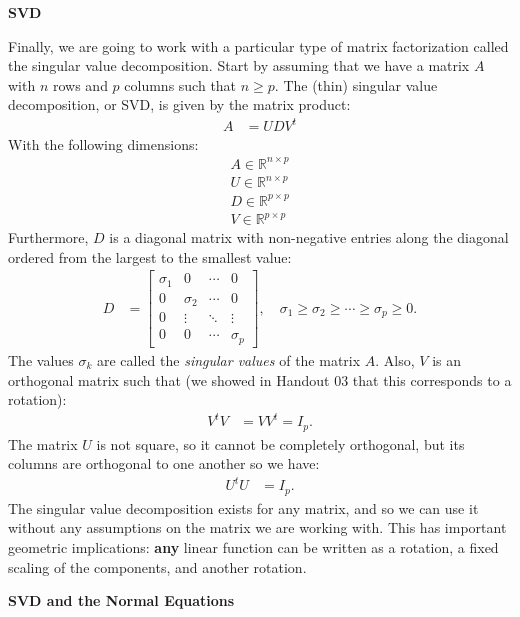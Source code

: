 \documentclass[12pt,hidelinks]{article}
\numberwithin{equation}{section}
\begin{document}
\textbf{SVD}

Finally, we are going to work with a particular type of matrix factorization
called the singular value decomposition. Start by assuming that we have a
matrix $A$ with $n$ rows and $p$ columns such that $n \geq p$. The (thin)
singular value decomposition, or SVD, is given by the matrix product:
\begin{align}
A &= U D V^t
\end{align}
With the following dimensions:
\begin{align}
A \in \mathbb{R}^{n \times p} \\
U \in \mathbb{R}^{n \times p} \\
D \in \mathbb{R}^{p \times p} \\
V \in \mathbb{R}^{p \times p}
\end{align}
Furthermore, $D$ is a diagonal matrix with non-negative entries along the
diagonal ordered from the largest to the smallest value:
\begin{align}
D &= \begin{bmatrix}
\sigma_1 & 0 & \cdots & 0\\
0 & \sigma_2 & \cdots & 0 \\
0 & \vdots & \ddots & \vdots \\
0 & 0 & \cdots & \sigma_p \end{bmatrix}, \quad \sigma_1 \geq \sigma_2 \geq \cdots \geq \sigma_p \geq 0.
\end{align}
The values $\sigma_k$ are called the \textit{singular values} of the matrix $A$.
Also, $V$ is an orthogonal matrix such that (we showed in Handout 03 that this
corresponds to a rotation):
\begin{align}
V^t V &= V V^t = I_p.
\end{align}
The matrix $U$ is not square, so it cannot be completely orthogonal, but its
columns are orthogonal to one another so we have:
\begin{align}
U^t U &= I_p.
\end{align}
The singular value decomposition exists for any matrix, and so we can use it
without any assumptions on the matrix we are working with. This has important
geometric implications: \textbf{any} linear function can be written as a
rotation, a fixed scaling of the components, and another rotation.

\textbf{SVD and the Normal Equations}
\end{document}
